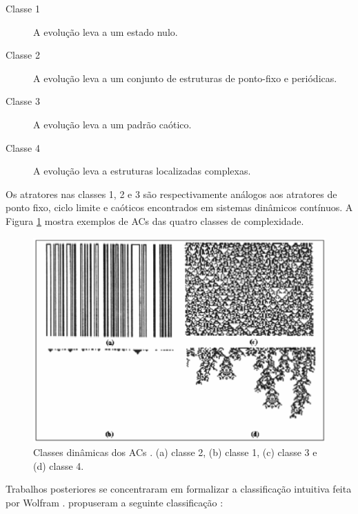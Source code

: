 \documentclass[12pt,a4paper]{article}
\begin{document}
\begin{description}
\item[Classe 1] A evolução leva a um estado nulo.
\item[Classe 2] A evolução leva a um conjunto de estruturas de ponto-fixo e periódicas.
\item[Classe 3] A evolução leva a um padrão caótico.
\item[Classe 4] A evolução leva a estruturas localizadas complexas.
\end{description}

Os atratores nas classes 1, 2 e 3 são respectivamente análogos aos atratores
de ponto fixo, ciclo limite e caóticos encontrados em sistemas dinâmicos
contínuos. A Figura \ref{fig:classes} mostra exemplos de ACs
das quatro classes de complexidade.

\begin{figure}[htp]
\begin{center}
\includegraphics[scale=0.5]{img/classes.eps}
\caption{Classes dinâmicas dos ACs .
(a) classe 2, (b) classe 1, (c) classe 3 e (d) classe 4.}
\label{fig:classes}
\end{center}
\end{figure}

Trabalhos posteriores se concentraram em formalizar a classificação intuitiva
feita por Wolfram .  propuseram a seguinte
classificação :
\end{document}
